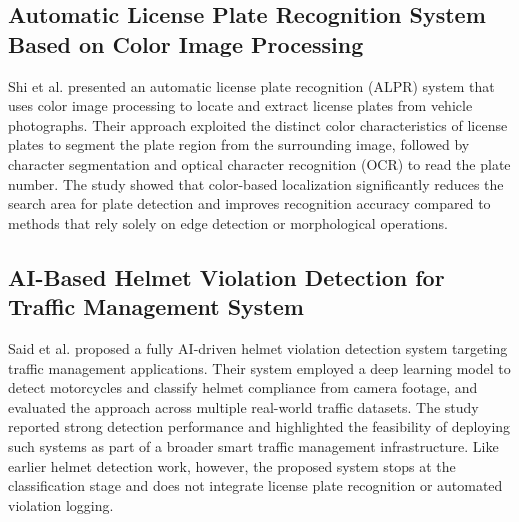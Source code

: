 \subsection{Automatic License Plate Recognition System Based on Color Image Processing}
\begin{subsecbody}
Shi et al. \cite{paper:alpr} presented an automatic license plate recognition (ALPR) system that uses color image processing to locate and extract license plates from vehicle photographs. Their approach exploited the distinct color characteristics of license plates to segment the plate region from the surrounding image, followed by character segmentation and optical character recognition (OCR) to read the plate number. The study showed that color-based localization significantly reduces the search area for plate detection and improves recognition accuracy compared to methods that rely solely on edge detection or morphological operations.
\end{subsecbody}

\subsection{AI-Based Helmet Violation Detection for Traffic Management System}
\begin{subsecbody}
Said et al. \cite{paper:ai-helmet} proposed a fully AI-driven helmet violation detection system targeting traffic management applications. Their system employed a deep learning model to detect motorcycles and classify helmet compliance from camera footage, and evaluated the approach across multiple real-world traffic datasets. The study reported strong detection performance and highlighted the feasibility of deploying such systems as part of a broader smart traffic management infrastructure. Like earlier helmet detection work, however, the proposed system stops at the classification stage and does not integrate license plate recognition or automated violation logging.
\end{subsecbody}
